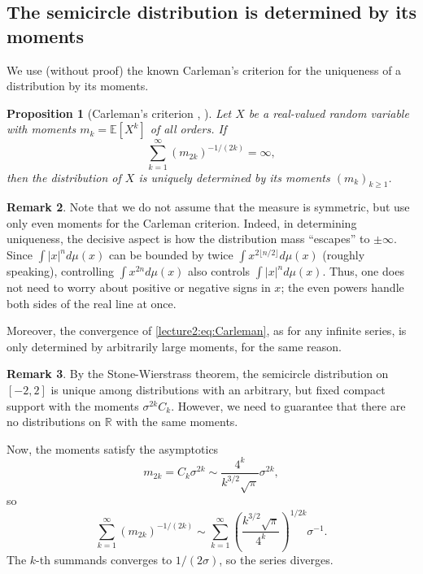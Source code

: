 \documentclass[letterpaper,11pt,oneside,reqno]{book}
\numberwithin{equation}{chapter}  %
\newtheorem{proposition}{Proposition}[chapter]  %
\theoremstyle{definition}
\newtheorem{remark}[proposition]{Remark}
\begin{document}
\subsection{The semicircle distribution is determined by its moments}
\label{lecture2:sub:carleman-semicircle}

We use (without proof)
the known Carleman's criterion for the uniqueness of a distribution by its moments.
\begin{proposition}[Carleman's criterion
	{\cite[Theorem~1.10]{shohat1943problem}}, \cite{Akhiezer1965Moment}]
	\label{lecture2:prop:carleman}
	Let $X$ be a real-valued random variable with moments $m_k
	= \mathbb{E}[X^k]$ of all orders. If
	\begin{equation}
		\label{lecture2:eq:Carleman}
		\sum_{k=1}^{\infty}
		(m_{2k})^{-1/(2k)} = \infty,
	\end{equation}
	then the distribution of
	$X$ is uniquely determined by its moments $(m_k)_{k\geq 1}$.
\end{proposition}
\begin{remark}
Note that we do not assume that the measure is symmetric,
but use only even moments for the Carleman criterion.
Indeed,
in determining uniqueness, the decisive aspect is how the
distribution mass ``escapes'' to \(\pm \infty\). Since
\(\int |x|^n d\mu(x)\) can be bounded by twice \(\int x^{2
\lfloor n/2 \rfloor} d\mu(x)\) (roughly speaking),
controlling \(\int x^{2n} d\mu(x)\) also controls \(\int
|x|^n d\mu(x)\). Thus, one does not need to worry about
positive or negative signs in \(x\); the even powers handle
both sides of the real line at once.

Moreover, the convergence of \eqref{lecture2:eq:Carleman},
as for any infinite series, is only determined
by arbitrarily large moments, for the same reason.
\end{remark}
\begin{remark}
	By the Stone-Wierstrass theorem,
	the semicircle distribution on $[-2,2]$ is
	unique among distributions
	with an
	arbitrary, but fixed compact support with the moments
	$\sigma^{2k} C_k$.
	However, we need to guarantee that there are no
	distributions on $\mathbb{R}$ with the same moments.
\end{remark}

Now, the moments satisfy the asymptotics
\begin{equation*}
	m_{2k}=C_k \sigma^{2k} \sim
	\frac{4^k}{k^{3/2}\sqrt{\pi}} \sigma^{2k},
\end{equation*}
so
\begin{equation*}
	\sum_{k=1}^{\infty} (m_{2k})^{-1/(2k)} \sim
	\sum_{k=1}^{\infty} \left( \frac{k^{3/2}\sqrt{\pi}}{4^k} \right)^{1/2k} \sigma^{-1}.
\end{equation*}
The $k$-th summands converges to $1/(2\sigma)$, so the
series diverges.
\end{document}

